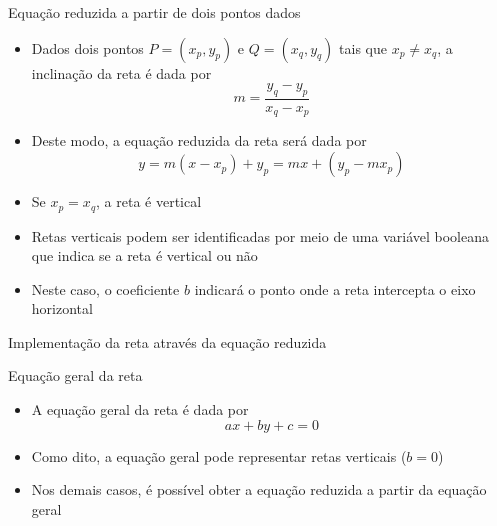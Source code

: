 \begin{frame}[fragile]{Equação reduzida a partir de dois pontos dados}

    \begin{itemize}
        \item Dados dois pontos $P = (x_p, y_p)$ e $Q = (x_q, y_q)$ tais que $x_p \neq x_q$, 
        a inclinação da reta é dada por
        \[
            m = \frac{y_q - y_p}{x_q - x_p}
        \]
        \pause

        \item Deste modo, a equação reduzida da reta será dada por
        \[
            y = m(x - x_p) + y_p = mx + (y_p - mx_p)
        \]
        \pause

        \item Se $x_p = x_q$, a reta é vertical
        \pause


        \item Retas verticais podem ser identificadas por meio de uma variável booleana que indica
            se a reta é vertical ou não
        \pause

        \item Neste caso, o coeficiente $b$ indicará o ponto onde a reta intercepta o eixo horizontal
    \end{itemize}

\end{frame}

\begin{frame}[fragile]{Implementação da reta através da equação reduzida}
\end{frame}

\begin{frame}[fragile]{Equação geral da reta}

    \begin{itemize}
        \item A equação geral da reta é dada por
        \[
            ax + by + c = 0
        \]
        \pause

        \item Como dito, a equação geral pode representar retas verticais ($b = 0$)
        \pause

        \item Nos demais casos, é possível obter a equação reduzida a partir da equação geral
        \pause


    \end{itemize}

\end{frame}

